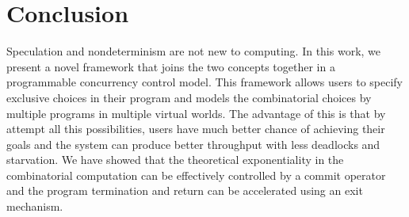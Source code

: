 \section{Conclusion}\label{sec:conclusion}
Speculation and nondeterminism are not new to computing.
In this work, we present a novel framework that joins the two
concepts together in a programmable concurrency control model. 
This framework allows users to specify exclusive choices in their program
and models the combinatorial choices by multiple programs in 
multiple virtual worlds. The advantage of this is that by attempt all
this possibilities, users have much better chance of achieving their
goals and the system can produce better throughput with less 
deadlocks and starvation. We have showed that the theoretical
exponentiality in the combinatorial computation can be effectively
controlled by a commit operator and the program termination and return
can be accelerated using an exit mechanism.
